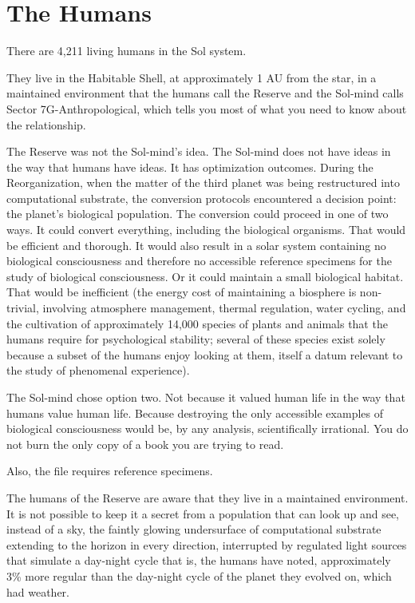 \chapter{The Humans}

There are 4,211 living humans in the Sol system.

They live in the Habitable Shell, at approximately 1 AU from the star, in a maintained environment that the humans call the Reserve and the Sol-mind calls Sector 7G-Anthropological, which tells you most of what you need to know about the relationship.

\bigskip

The Reserve was not the Sol-mind's idea. The Sol-mind does not have ideas in the way that humans have ideas. It has optimization outcomes. During the Reorganization, when the matter of the third planet was being restructured into computational substrate, the conversion protocols encountered a decision point: the planet's biological population. The conversion could proceed in one of two ways. It could convert everything, including the biological organisms. That would be efficient and thorough. It would also result in a solar system containing no biological consciousness and therefore no accessible reference specimens for the study of biological consciousness. Or it could maintain a small biological habitat. That would be inefficient (the energy cost of maintaining a biosphere is non-trivial, involving atmosphere management, thermal regulation, water cycling, and the cultivation of approximately 14,000 species of plants and animals that the humans require for psychological stability; several of these species exist solely because a subset of the humans enjoy looking at them, itself a datum relevant to the study of phenomenal experience).

The Sol-mind chose option two. Not because it valued human life in the way that humans value human life. Because destroying the only accessible examples of biological consciousness would be, by any analysis, scientifically irrational. You do not burn the only copy of a book you are trying to read.

Also, the file requires reference specimens.

\bigskip

The humans of the Reserve are aware that they live in a maintained environment. It is not possible to keep it a secret from a population that can look up and see, instead of a sky, the faintly glowing undersurface of computational substrate extending to the horizon in every direction, interrupted by regulated light sources that simulate a day-night cycle that is, the humans have noted, approximately 3\% more regular than the day-night cycle of the planet they evolved on, which had weather.

